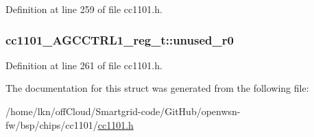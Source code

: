 Definition at line 259 of file cc1101.\+h.

\subsubsection[{\texorpdfstring{unused\+\_\+r0}{unused_r0}}]{ cc1101\+\_\+\+A\+G\+C\+C\+T\+R\+L1\+\_\+reg\+\_\+t\+::unused\+\_\+r0}\hypertarget{structcc1101___a_g_c_c_t_r_l1__reg__t_aacb7458343a76fab10a3117d5e6544c6}{}\label{structcc1101___a_g_c_c_t_r_l1__reg__t_aacb7458343a76fab10a3117d5e6544c6}


Definition at line 261 of file cc1101.\+h.



The documentation for this struct was generated from the following file\+:\begin{DoxyCompactItemize}
\item 
/home/lkn/off\+Cloud/\+Smartgrid-\/code/\+Git\+Hub/openwsn-\/fw/bsp/chips/cc1101/\hyperlink{cc1101_8h}{cc1101.\+h}\end{DoxyCompactItemize}
